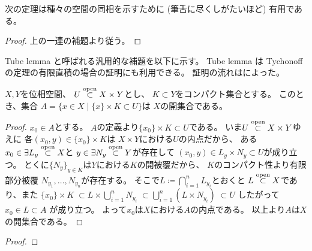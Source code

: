 \documentclass[report]{jlreq}
\begin{document}
次の定理は種々の空間の同相を示すために (筆舌に尽くしがたいほど) 有用である。


\begin{proof}
    上の一連の補題より従う。
\end{proof}

Tube lemma と呼ばれる汎用的な補題を以下に示す。
Tube lemma は Tychonoff の定理の有限直積の場合の証明にも利用できる。
証明の流れは\cite[p.189]{Rot98}によった。

\begin{lemma}
    $X, Y$を位相空間、
    $U \stackrel{\text{open}}{\subset} X \times Y$とし、
    $K \subset Y$をコンパクト集合とする。
    このとき、集合
    $A = \{ x \in X \mid \{ x \} \times K \subset U \}$は
    $X$の開集合である。
\end{lemma}

\begin{proof}
    $x_0 \in A$とする。
    $A$の定義より$\{ x_0 \} \times K \subset U$である。
    いま$U \stackrel{\text{open}}{\subset} X \times Y$ゆえに
    各$(x_0, y) \in \{ x_0 \} \times K$は
    $X \times Y$における$U$の内点だから、
    ある$x_0 \in \exists L_y \stackrel{\text{open}}{\subset} X$と
    $y \in \exists N_y \stackrel{\text{open}}{\subset} Y$が存在して
    $(x_0, y) \in L_y \times N_y \subset U$が成り立つ。
    とくに$\{ N_y \}_{y \in K}$は$Y$における$K$の開被覆だから、
    $K$のコンパクト性より有限部分被覆
    $N_{y_1}, \dots, N_{y_n}$が存在する。
    そこで$L \coloneqq \bigcap_{i=1}^n L_{y_i}$とおくと
    $L \stackrel{\text{open}}{\subset} X$であり、また
    $\{ x_0 \} \times K \;
        \subset L \times \bigcup_{i=1}^n N_{y_i} \;
        \subset \bigcup_{i=1}^n (L \times N_{y_i}) \;
        \subset U$
    したがって
    $x_0 \in L \subset A$
    が成り立つ。
    よって$x_0$は$X$における$A$の内点である。
    以上より$A$は$X$の開集合である。
\end{proof}

\begin{theorem}[Tychonoff]
    \TODO{}
\end{theorem}

\begin{proof}
    \TODO{}
\end{proof}

%
\end{document}
